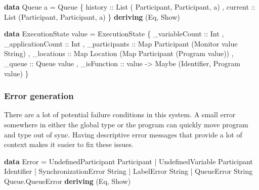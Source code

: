 \documentclass[runningheads]{llncs}
\newenvironment{Shaded}{}{}
\newcommand{\KeywordTok}[1]{\textcolor[rgb]{0.00,0.44,0.13}{\textbf{#1}}}
\newcommand{\DataTypeTok}[1]{\textcolor[rgb]{0.56,0.13,0.00}{#1}}
\newcommand{\OtherTok}[1]{\textcolor[rgb]{0.00,0.44,0.13}{#1}}
\newcommand{\FunctionTok}[1]{\textcolor[rgb]{0.02,0.16,0.49}{#1}}
\newcommand{\NormalTok}[1]{#1}
\begin{document}
\begin{Shaded}
\begin{Highlighting}[]
\KeywordTok{data} \DataTypeTok{Queue}\NormalTok{ a }\FunctionTok{=} \DataTypeTok{Queue} 
\NormalTok{    \{}\OtherTok{ history ::} \DataTypeTok{List}\NormalTok{ ( }\DataTypeTok{Participant}\NormalTok{, }\DataTypeTok{Participant}\NormalTok{, a)}
\NormalTok{    ,}\OtherTok{ current ::} \DataTypeTok{List}\NormalTok{ (}\DataTypeTok{Participant}\NormalTok{, }\DataTypeTok{Participant}\NormalTok{, a)}
\NormalTok{    \}}
    \KeywordTok{deriving}\NormalTok{ (}\DataTypeTok{Eq}\NormalTok{, }\DataTypeTok{Show}\NormalTok{)}

\KeywordTok{data} \DataTypeTok{ExecutionState}\NormalTok{ value }\FunctionTok{=} 
    \DataTypeTok{ExecutionState} 
\NormalTok{    \{}\OtherTok{ _variableCount ::} \DataTypeTok{Int}
\NormalTok{    ,}\OtherTok{ _applicationCount ::} \DataTypeTok{Int}
\NormalTok{    ,}\OtherTok{ _participants ::} \DataTypeTok{Map} \DataTypeTok{Participant}\NormalTok{ (}\DataTypeTok{Monitor}\NormalTok{ value }\DataTypeTok{String}\NormalTok{)}
\NormalTok{    ,}\OtherTok{ _locations ::} \DataTypeTok{Map} \DataTypeTok{Location}\NormalTok{ (}\DataTypeTok{Map} \DataTypeTok{Participant}\NormalTok{ (}\DataTypeTok{Program}\NormalTok{ value))}
\NormalTok{    ,}\OtherTok{ _queue ::} \DataTypeTok{Queue}\NormalTok{ value}
\NormalTok{    ,}\OtherTok{ _isFunction ::}\NormalTok{ value }\OtherTok{->} \DataTypeTok{Maybe}\NormalTok{ (}\DataTypeTok{Identifier}\NormalTok{, }\DataTypeTok{Program}\NormalTok{ value)}
\NormalTok{    \}}
\end{Highlighting}
\end{Shaded}

\subsubsection{Error generation}\label{error-generation}

There are a lot of potential failure conditions in this system. A small
error somewhere in either the global type or the program can quickly
move program and type out of sync.
Having descriptive error messages that provide a lot of context makes it
easier to fix these issues.

\begin{Shaded}
\begin{Highlighting}[]
\KeywordTok{data} \DataTypeTok{Error} 
    \FunctionTok{=} \DataTypeTok{UndefinedParticipant} \DataTypeTok{Participant}
    \FunctionTok{|} \DataTypeTok{UndefinedVariable} \DataTypeTok{Participant} \DataTypeTok{Identifier}
    \FunctionTok{|} \DataTypeTok{SynchronizationError} \DataTypeTok{String}
    \FunctionTok{|} \DataTypeTok{LabelError} \DataTypeTok{String}
    \FunctionTok{|} \DataTypeTok{QueueError} \DataTypeTok{String} \DataTypeTok{Queue.QueueError}
    \KeywordTok{deriving}\NormalTok{ (}\DataTypeTok{Eq}\NormalTok{, }\DataTypeTok{Show}\NormalTok{)}
\end{Highlighting}
\end{Shaded}
\end{document}
